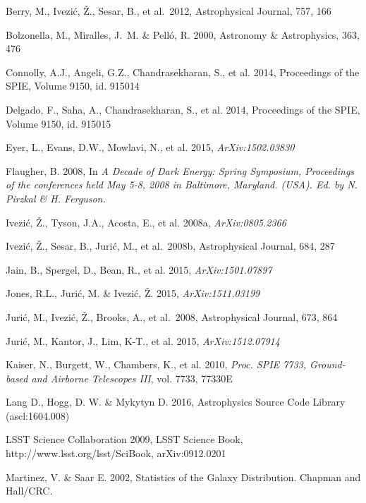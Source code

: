 \documentclass{iau}
\begin{document}
\begin{thebibliography}{}
\bibitem[()]{} Berry, M., Ivezi\'c, \v Z., Sesar, B., et al.~2012, Astrophysical Journal, 757, 166

\bibitem[()]{} Bolzonella, M., Miralles, J.~M. \& Pell\'{o}, R. 2000, Astronomy \& Astrophysics, 363, 476

\bibitem[()]{} Connolly, A.J., Angeli, G.Z., Chandrasekharan, S., et al. 2014, Proceedings of the SPIE, 
          Volume 9150, id. 915014

\bibitem[()]{} Delgado, F., Saha, A., Chandrasekharan, S., et al. 2014, Proceedings of the SPIE, Volume 9150, 
          id. 915015

\bibitem[()]{} Eyer, L., Evans, D.W., Mowlavi, N., et al. 2015, \textit{{\rm ArXiv:}1502.03830}

{Flaugher, B. 2008}, In \textit{A Decade of Dark Energy: Spring Symposium, Proceedings of
  the conferences held May 5-8, 2008 in Baltimore, Maryland. (USA). Ed. by N. Pirzkal \& H. Ferguson.}

 {Ivezi{\'c}, {\v Z}., Tyson, J.A., Acosta, E., et al. 2008a}, \textit{{\rm ArXiv:}0805.2366}

\bibitem[()]{} Ivezi\'c, \v Z., Sesar, B., Juri\'{c}, M., et al.~2008b, Astrophysical Journal, 684, 287

\bibitem[()]{} Jain, B., Spergel, D., Bean, R., et al. 2015, \textit{{\rm ArXiv:}1501.07897}

\bibitem[()]{} Jones, R.L., Juri\'{c}, M. \& Ivezi\'c, \v Z. 2015, \textit{{\rm ArXiv:}1511.03199}

\bibitem[()]{} Juri\'{c}, M., Ivezi\'c, \v Z., Brooks, A., et al.~2008, Astrophysical Journal, 673, 864

\bibitem[()]{} Juri\'{c}, M., Kantor, J., Lim, K-T., et al. 2015, \textit{{\rm ArXiv:}1512.07914}

{Kaiser, N., Burgett, W., Chambers, K., et al. 2010}, 
\textit{Proc. SPIE 7733, Ground-based and Airborne Telescopes III}, vol. 7733, 77330E

\bibitem[()]{} Lang D., Hogg, D. W. \& Mykytyn D. 2016, Astrophysics Source Code Library (ascl:1604.008)

{LSST Science Collaboration 2009}, 
LSST Science Book, http://www.lsst.org/lsst/SciBook, arXiv:0912.0201

\bibitem[()]{} Martinez, V. \& Saar E. 2002, Statistics of the Galaxy Distribution. Chapman and Hall/CRC.


\end{thebibliography}
\end{document}

